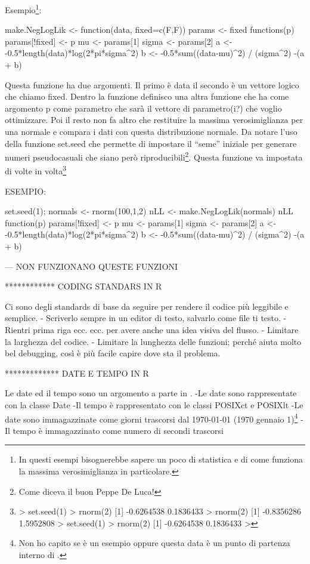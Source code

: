 Esempio\footnote{In questi esempi bisognerebbe sapere un poco di statistica e di come funziona la massima verosimiglianza in particolare.}: 

make.NegLogLik <- function(data, fixed=c(F,F)){
	params <- fixed
	functions(p){
		params[!fixed] <- p
		mu <- params[1]
		sigma <- params[2]
		a <- -0.5*length(data)*log(2*pi*sigma^2)
		b <- -0.5*sum((data-mu)^2) / (sigma^2)
		-(a + b)
	}
}

Questa funzione ha due argomenti. Il primo è data il secondo è un vettore logico che chiamo fixed. Dentro la funzione definisco una altra funzione che ha come argomento p come parametro che sarà il vettore di parametro(i?) che voglio ottimizzare.
Poi il resto non fa altro che restituire la massima verosimiglianza per una normale e compara i dati con questa distribuzione normale.
Da notare l'uso della funzione set.seed che permette di impostare il ``seme'' iniziale per generare numeri pseudocasuali che siano però riproducibili\footnote{Come diceva il buon Peppe De Luca!}. Questa funzione va impostata di volte in volta\footnote{
> set.seed(1)
> rnorm(2)
[1] -0.6264538  0.1836433
> rnorm(2)
[1] -0.8356286  1.5952808
> set.seed(1)
> rnorm(2)
[1] -0.6264538  0.1836433
> 
}


ESEMPIO:

set.seed(1); normals <- rnorm(100,1,2)
nLL <- make.NegLogLik(normals)
nLL
function(p){
	params[!fixed] <- p
	mu <- params[1]
	sigma <- params[2]
	a <- -0.5*length(data)*log(2*pi*sigma^2)
	b <- -0.5*sum((data-mu)^2) / (sigma^2)
	-(a + b)
}

--- NON FUNZIONANO QUESTE FUNZIONI


************ CODING STANDARS IN R

Ci sono degli standards di base da seguire per rendere il codice più leggibile e semplice.
- Scriverlo sempre in un editor di testo, salvarlo come file ti testo.
- Rientri prima riga ecc. ecc. per avere anche una idea visiva del flusso.
- Limitare la larghezza del codice.
- Limitare la lunghezza delle funzioni; perché aiuta molto bel debugging, così è più facile capire dove sta il problema.


************* DATE E TEMPO IN R

Le date ed il tempo sono un argomento a parte in \erre.
-Le date sono rappresentate con la classe Date
-Il tempo è rappresentato con le classi POSIXct e POSIXlt 
-Le date sono immagazzinate come giorni trascorsi dal 1970-01-01 (1970 gennaio 1)\footnote{Non ho capito se è un esempio oppure questa data è un punto di partenza interno di \erre.}
-Il tempo è immagazzinato come numero di secondi trascorsi 

